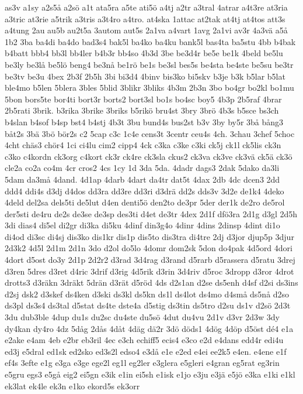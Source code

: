 {as3v
a1sy
a2s5å
a2sö
a1t
ata5ra
a5te
ati5ö
a4tj
a2tr
a3tral
4atrar
a4t3re
at3ria
a3tric
at3rie
a5trik
a3tris
a3t4ro
a4tro.
at4ska
1attac
at2tak
at4tj
at4tos
att3s
a4tung
2au
au5b
au2t5a
3autom
aut5s
2a1va
a4vart
1avg
2a1vi
av3r
4a3vä
a5å
1b2
3ba
ba4di
ba4do
bad3s4
bak5l
ba4ko
ba4ku
bank5l
bas4ta
ba5stu
4bb
b4bak
b4batt
bbb4
bb3l
bb4ler
b4b3r
bb4so
4b3d
3be
be3d4r
be5e
be1k
4beld
be5lu
be3ly
be3lå
be5lö
beng4
be3nå
be1rö
be1s
be3sl
bes5s
be4sta
be4ste
be5su
be3tr
be3tv
be3u
4bex
2b3f
2b5h
3bi
bi3d4
4binv
bis3ko
bi5skv
b3je
b3k
b5lar
b5lat
ble4mo
b5len
5blera
3bles
5blid
3blikr
3bliks
4b3m
2b3n
3bo
bo4gr
bo2kl
bo1mu
5bon
bors5te
bor4ti
bort3r
borts2
bort3sl
bo1s
bo4sc
boy5
4b3p
2b5raf
4brar
2b5rati
3brik.
b3rika
3brike
3briks
b5rikö
bru4st
3bry
3brö
4b3s
b5sce
bs3ch
b4slan
b4sof
b4sp
bst4
b4stj
4b3t
3bu
bund4s
bus2st
b3v
3by
by5r
3bå
bång3
båt2s
3bä
3bö
bör2s
c2
5cap
c3c
1c4e
cens3t
3centr
ceu4s
4ch.
3chau
3chef
5choc
4cht
chäs3
chör4
1ci
ci4lu
cim2
cipp4
4ck
c3ka
c3ke
c3ki
ck5j
ck1l
ck5lis
ck3n
c3ko
c4kordn
ck3org
c4kort
ck3r
ck4re
ck3sla
ckus2
ck3va
ck3ve
ck3vä
ck5ä
ck3ö
cle2a
co2a
co4m
4cr
cros2
4cs
1cy
1d
3da
5da.
4dadr
dags3
2dak
5dako
da3li
5dam
da3må
4dand.
4d1ap
4darb
4dart
da4tr
dat5t
4dax
2db
4dc
dcen3
2dd
ddd4
ddi4s
d3dj
d4dos
dd3ra
dd3re
dd3ri
d3drä
dd2s
dds3v
3d2e
de1k4
4deko
4deld
del2sa
dels5ti
de5lut
d4en
denti5ö
den2to
de3pr
5der
der1k
de2ro
de5rol
der5sti
de4ru
de2s
de3se
de3sp
des3ti
d4et
de3tr
4dex
2d1f
dfö3ra
2d1g
d3gl
2d5h
3di
dias4
di5el
di2gr
di3ka
di5ku
4dinf
din3g4o
4dinr
4dins
2dinsp
4dint
di1o
di4od
di3sc
di4sj
dis3ko
dis1kr
dis1p
dis5to
dis3tra
di4tre
2dj
d3jor
djup5p
3djur
2d3k2
4d5l
2d1m
2d1n
3do
d2ol
do5lo
4domr
dom2sk
5don
do4pak
4d5ord
4dori
4dort
d5ost
do3y
2d1p
2d2r2
d3rad
3d4rag
d3rand
d5rarb
d5rassera
d5ratu
3drej
d3ren
5dres
d3ret
d4ric
3drif
d3rig
4d5rik
d3rin
3d4riv
d5roc
3dropp
d3ror
4drot
drotts3
d3räkn
3dräkt
5drän
d3rät
d5röd
4ds
d2s1an
d2se
ds5enh
d4sf
d2si
ds3ins
d2sj
dsk2
d3skef
ds4ken
d3ski
ds3kl
ds5kn
ds1l
ds4lot
ds4mo
d4små
ds5nå
d2so
ds3pl
ds3s4
ds3tal
d5stat
ds4te
dste4a
d5stig
ds3tin
ds5tro
d2su
ds1v
d2sö
2d3t
3du
dub3ble
4dup
du1s
du2sc
du4ste
du5sö
4dut
du4vu
2d1v
d3vr
2d3w
3dy
dy4kan
dy4ro
4dz
5dåg
2dås
4dåt
4däg
dä2r
3dö
döds1
4dög
4döp
d5öst
dé4
e1a
e2ake
e4am
4eb
e2br
eb3ril
4ec
e3ch
echiff5
ecis4
e3co
e2d
e4dans
edd4r
edi4u
ed3j
e5dral
ed1sk
ed2sko
ed3s2l
edso4
e3då
e1e
e2ed
e4ei
ee2k5
e4en.
e4ene
e1f
ef4s
3efte
e1g
e3ga
e3ge
ege2l
eg1l
eg2ler
e3glera
e5gleri
e4gran
eg5rat
eg3rin
e5gru
egs3
e5gå
eig2
ei5gn
e3ik
e1in
ei5sh
e1isk
e1jo
e3ju
e3jä
e5jö
e3ka
e1ki
e1kl
ek3lat
ek4le
ek3n
e1ko
ekord5s
ek3orr
}
